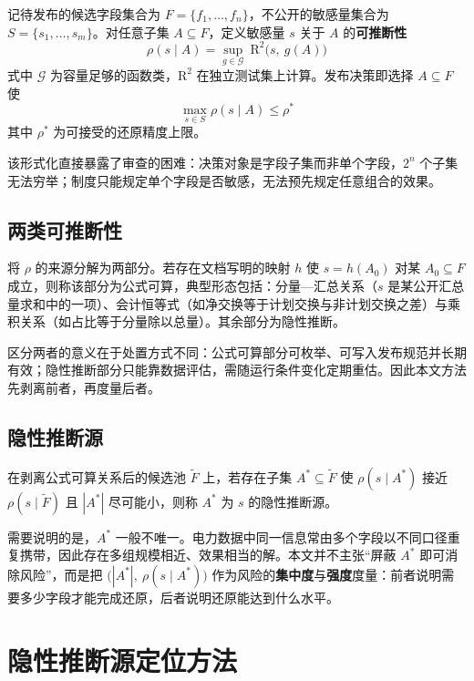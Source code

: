\documentclass[UTF8,zihao=5,twoside]{ctexart}
\begin{document}
记待发布的候选字段集合为 $F=\{f_1,\dots,f_n\}$，不公开的敏感量集合为 $S=\{s_1,\dots,s_m\}$。对任意子集 $A\subseteq F$，定义敏感量 $s$ 关于 $A$ 的\textbf{可推断性}
\begin{equation}
\rho(s\mid A)=\sup_{g\in\mathcal{G}}\ \mathrm{R}^2\big(s,\ g(A)\big)
\end{equation}
式中 $\mathcal{G}$ 为容量足够的函数类，$\mathrm{R}^2$ 在独立测试集上计算。发布决策即选择 $A\subseteq F$ 使
\begin{equation}
\max_{s\in S}\rho(s\mid A)\le \rho^{\ast}
\end{equation}
其中 $\rho^{\ast}$ 为可接受的还原精度上限。

该形式化直接暴露了审查的困难：决策对象是字段子集而非单个字段，$2^n$ 个子集无法穷举；制度只能规定单个字段是否敏感，无法预先规定任意组合的效果。

\subsection{两类可推断性}

将 $\rho$ 的来源分解为两部分。若存在文档写明的映射 $h$ 使 $s=h(A_0)$ 对某 $A_0\subseteq F$ 成立，则称该部分为公式可算，典型形态包括：分量—汇总关系（$s$ 是某公开汇总量求和中的一项）、会计恒等式（如净交换等于计划交换与非计划交换之差）与乘积关系（如占比等于分量除以总量）。其余部分为隐性推断。

区分两者的意义在于处置方式不同：公式可算部分可枚举、可写入发布规范并长期有效；隐性推断部分只能靠数据评估，需随运行条件变化定期重估。因此本文方法先剥离前者，再度量后者。

\subsection{隐性推断源}

在剥离公式可算关系后的候选池 $\tilde F$ 上，若存在子集 $A^{\ast}\subseteq\tilde F$ 使 $\rho(s\mid A^{\ast})$ 接近 $\rho(s\mid \tilde F)$ 且 $|A^{\ast}|$ 尽可能小，则称 $A^{\ast}$ 为 $s$ 的隐性推断源。

需要说明的是，$A^{\ast}$ 一般不唯一。电力数据中同一信息常由多个字段以不同口径重复携带，因此存在多组规模相近、效果相当的解。本文并不主张“屏蔽 $A^{\ast}$ 即可消除风险”，而是把 $\big(|A^{\ast}|,\ \rho(s\mid A^{\ast})\big)$ 作为风险的\textbf{集中度}与\textbf{强度}度量：前者说明需要多少字段才能完成还原，后者说明还原能达到什么水平。

\section{隐性推断源定位方法}
\end{document}

